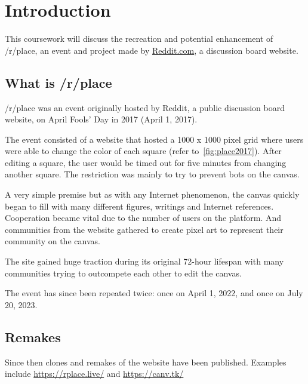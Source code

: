

\section{Introduction}\label{sec:introduction}

This coursework will discuss the recreation and potential enhancement of /r/place, an event and project made by \href{https://www.reddit.com/}{Reddit.com}, a discussion board website.

\subsection{What is /r/place}\label{subsec:what-is-/r/place}

/r/place was an event originally hosted by Reddit, a public discussion board website, on April Fools' Day in 2017 (April 1, 2017).

The event consisted of a website that hosted a 1000 x 1000 pixel grid where users were able to change the color of each square (refer to~\ref{fig:place2017}).
After editing a square, the user would be timed out for five minutes from changing another square.
The restriction was mainly to try to prevent bots on the canvas.

A very simple premise but as with any Internet phenomenon, the canvas quickly began to fill with many different figures, writings and Internet references.
Cooperation became vital due to the number of users on the platform.
And communities from the website gathered to create pixel art to represent their community on the canvas.

The site gained huge traction during its original 72-hour lifespan with many communities trying to outcompete each other to edit the canvas.

The event has since been repeated twice: once on April 1, 2022, and once on July 20, 2023.

\subsection{Remakes}\label{subsec:remakes}

Since then clones and remakes of the website have been published.
Examples include  \url{https://rplace.live/} and \url{https://canv.tk/}
